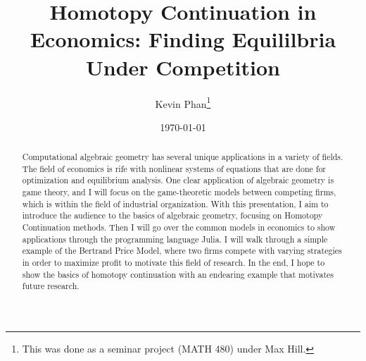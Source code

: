 \documentclass[12pt, answers]{exam}
\title{Homotopy Continuation in Economics: Finding Equililbria Under Competition}
\author{Kevin Phan\thanks{This was done as a seminar project (MATH 480) under Max Hill.}}
\date{\today}
\theoremstyle{definition}
\begin{document}
\maketitle
\doublespacing

\begin{abstract}
    Computational algebraic geometry has several unique applications in a variety of fields. The field of economics is rife with nonlinear systems of equations that are done for optimization and equilibrium analysis. One clear application of algebraic geometry is game theory, and I will focus on the game-theoretic models between competing firms, which is within the field of industrial organization.  With this presentation, I aim to introduce the audience to the basics of algebraic geometry, focusing on Homotopy Continuation methods. Then I will go over the common models in economics to show applications through the programming language Julia. I will walk through a simple example of the Bertrand Price Model, where two firms compete with varying strategies in order to maximize profit to motivate this field of research. In the end, I hope to show the basics of homotopy continuation with an endearing example that motivates future research.
\end{abstract}



\end{document}
